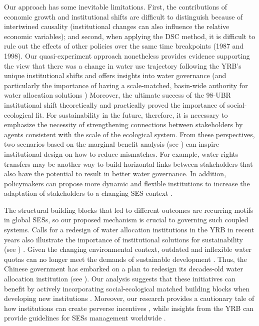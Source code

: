 
Our approach has some inevitable limitations.
First, the contributions of economic growth and institutional shifts are difficult to distinguish because of intertwined causality (institutional changes can also influence the relative economic variables);
and second, when applying the DSC method, it is difficult to rule out the effects of other policies over the same time breakpoints (1987 and 1998).
Our quasi-experiment approach nonetheless provides evidence supporting the view that there was a change in water use trajectory following the YRB's unique institutional shifts and offers insights into water governance (and particularly the importance of having a scale-matched, basin-wide authority for water allocation solutions \cite{bodin2017b, ostrom2009, reyers2018})
Moreover, the ultimate success of the 98-UBR institutional shift theoretically and practically proved the importance of social-ecological fit.
For sustainability in the future, therefore, it is necessary to emphasize the necessity of strengthening connections between stakeholders by agents consistent with the scale of the ecological system.
From these perspectives, two scenarios based on the marginal benefit analysis (see \textit{}) can inspire institutional design on how to reduce mismatches.
For example, water rights transfers may be another way to build horizontal links between stakeholders that also have the potential to result in better water governance.
In addition, policymakers can propose more dynamic and flexible institutions to increase the adaptation of stakeholders to a changing SES context \cite{reyers2018}.

The structural building blocks that led to different outcomes are recurring motifs in global SESs, so our proposed mechanism is crucial to governing such coupled systems.
Calls for a redesign of water allocation institutions in the YRB in recent years also illustrate the importance of institutional solutions for sustainability (see \textit{}) \cite{yu2019}.
Given the changing environmental context, outdated and inflexible water quotas can no longer meet the demands of sustainable development \cite{wang2019a}.
Thus, the Chinese government has embarked on a plan to redesign its decades-old water allocation institution (see \textit{}).
Our analysis suggests that these initiatives can benefit by actively incorporating social-ecological matched building blocks when developing new institutions \cite{bodin2017b}.
Moreover, our research provides a cautionary tale of how institutions can create perverse incentives \cite{hegwood2022}, while insights from the YRB can provide guidelines for SESs management worldwide \cite{muneepeerakul2017, leslie2015}.
